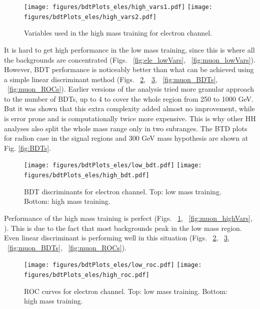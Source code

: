 \begin{figure}[tbp]
  \begin{center}
   \texttt{[image: figures/bdtPlots\_eles/high\_vars1.pdf]}
   \texttt{[image: figures/bdtPlots\_eles/high\_vars2.pdf]}
    \caption{ Variables used in the high mass training for electron channel.}
    \label{fig:ele_highVars}
  \end{center}
\end{figure}


It is hard to get high performance in the low mass training, since
this is where all the backgrounds are concentrated (Figs. ~\ref{fig:ele_lowVars}, ~\ref{fig:muon_lowVars}). However, BDT performance is noticeably better than what can be achieved using a
simple linear discriminant method (Figs. ~\ref{fig:ele_BDTs}, ~\ref{fig:ele_ROCs}, ~\ref{fig:muon_BDTs}, ~\ref{fig:muon_ROCs}). Earlier versions of the analysis tried more granular approach to the number of BDTs, up to 4 to cover the whole region from 250 to 1000 GeV. But it was shown that this extra complexity added almost no improvement, while is error prone and is computationally twice more expensive. This is why other HH analyses also split the whole mass range only in two subranges. The BTD plots for radion case in the signal regions and 300 GeV mass hypothesis are shown at Fig. \ref{fig:BDTs}.



\begin{figure}[tbp]
  \begin{center}
   \texttt{[image: figures/bdtPlots\_eles/low\_bdt.pdf]}
   \texttt{[image: figures/bdtPlots\_eles/high\_bdt.pdf]}
    \caption{ BDT discriminants for electron channel. Top: low mass training. Bottom: high mass training. }
    \label{fig:ele_BDTs}
  \end{center}
\end{figure}

Performance of the high mass training is perfect (Figs. ~\ref{fig:ele_highVars}, ~\ref{fig:muon_highVars}, ). This is due to the
fact that most backgrounds peak in the low mass region. Even linear
discriminant is performing well in this situation (Figs. ~\ref{fig:ele_BDTs}, ~\ref{fig:ele_ROCs}, ~\ref{fig:muon_BDTs}, ~\ref{fig:muon_ROCs}).

\begin{figure}[tbp]
  \begin{center}
   \texttt{[image: figures/bdtPlots\_eles/low\_roc.pdf]}
   \texttt{[image: figures/bdtPlots\_eles/high\_roc.pdf]}
    \caption{ ROC curves for electron channel. Top: low mass training. Bottom: high mass training. }
    \label{fig:ele_ROCs}
  \end{center}
\end{figure}

